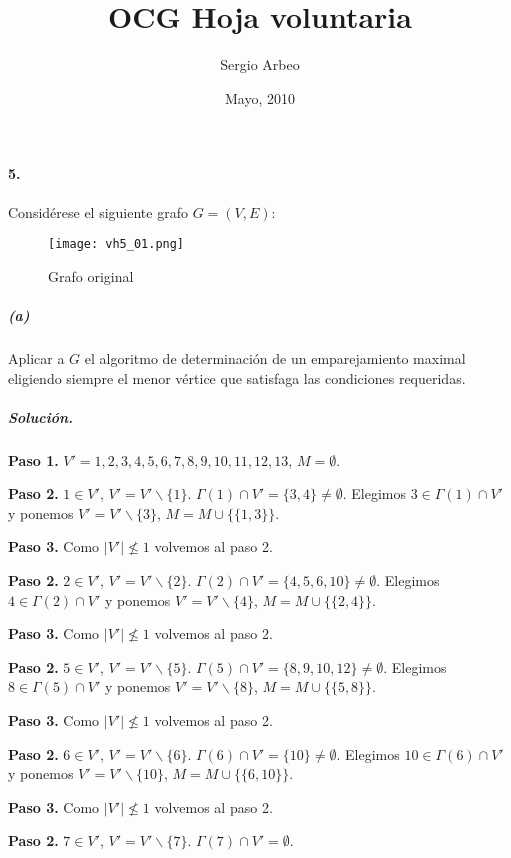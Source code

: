 \documentclass[12pt, oneside, a4paper]{article}
\begin{document}
\title{OCG Hoja voluntaria}\author{Sergio Arbeo}\date{Mayo, 2010}\maketitle
\paragraph{5.}\label{ssub:1_} %
Considérese el siguiente grafo $G=(V,E)$:

\begin{figure}[h]
\centering
\texttt{[image: vh5\_01.png]}
\caption{Grafo original}
\label{fig:vh4-01}
\end{figure}


\subparagraph{(a)} Aplicar a $G$ el algoritmo de determinación de un emparejamiento
maximal eligiendo siempre el menor vértice que satisfaga las
condiciones requeridas.

\subparagraph{Solución.\\}


{\bf Paso 1.}
$V'={1,2,3,4,5,6,7,8,9,10,11,12,13}$,
$M=\emptyset$.

{\bf Paso 2.} $1\in V'$,
$V'=V'\backslash
\{1\}$. $\Gamma(1)\cap V'=\{3, 4\}\neq
\emptyset$. Elegimos
$3\in\Gamma(1)\cap V'$ y ponemos
$V'=V'\backslash \{3\}$, $M=M\cup\{\{1,3\}\}$.

{\bf Paso 3.} Como $|V'|\not\leq 1$
volvemos al paso 2.

{\bf Paso 2.} $2\in V'$, $V'=V'\backslash
\{2\}$. $\Gamma(2)\cap V'=\{4, 5, 6,
10\}\neq\emptyset$. Elegimos
$4\in\Gamma(2)\cap V'$ y ponemos
$V'=V'\backslash \{4\}$,
$M=M\cup\{\{2,4\}\}$.

{\bf Paso 3.} Como $|V'|\not\leq 1$
volvemos al paso 2.

{\bf Paso 2.} $5\in V'$, $V'=V'\backslash
\{5\}$. $\Gamma(5)\cap V'=\{8, 9, 10,
12\}\neq\emptyset$. Elegimos
$8\in\Gamma(5)\cap V'$ y ponemos
$V'=V'\backslash \{8\}$,
$M=M\cup\{\{5,8\}\}$.

{\bf Paso 3.} Como $|V'|\not\leq 1$
volvemos al paso 2.

{\bf Paso 2.} $6\in V'$, $V'=V'\backslash
\{6\}$. $\Gamma(6)\cap
V'=\{10\}\neq\emptyset$. Elegimos
$10\in\Gamma(6)\cap V'$ y ponemos
$V'=V'\backslash \{10\}$,
$M=M\cup\{\{6,10\}\}$.

{\bf Paso 3.} Como $|V'|\not\leq 1$
volvemos al paso 2.

{\bf Paso 2.} $7\in V'$, $V'=V'\backslash
\{7\}$. $\Gamma(7)\cap
V'=\emptyset$.
\end{document}
